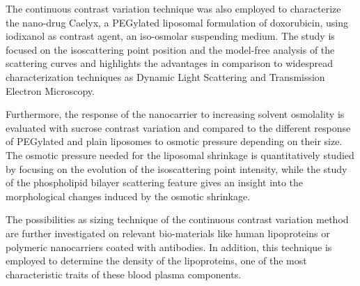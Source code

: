 The continuous contrast variation technique was also employed to characterize the nano-drug Caelyx, a PEGylated liposomal formulation of doxorubicin, using iodixanol as contrast agent, an iso-osmolar suspending medium. The study is focused on the isoscattering point position and the model-free analysis of the scattering curves and highlights the advantages in comparison to widespread characterization techniques as Dynamic Light Scattering and Transmission Electron Microscopy.


Furthermore, the response of the nanocarrier to increasing solvent osmolality is evaluated with sucrose contrast variation and compared to the different response of PEGylated and plain liposomes to osmotic pressure depending on their size. The osmotic pressure needed for the liposomal shrinkage is quantitatively studied by focusing on the evolution of the isoscattering point intensity, while the study of the phospholipid bilayer scattering feature gives an insight into the morphological changes induced by the osmotic shrinkage.

The possibilities as sizing technique of the continuous contrast variation method are further investigated on relevant bio-materials like human lipoproteins or polymeric nanocarriers coated with antibodies. In addition, this technique is employed to determine the density of the lipoproteins, one of the most characteristic traits of these blood plasma components.





\normalsize

